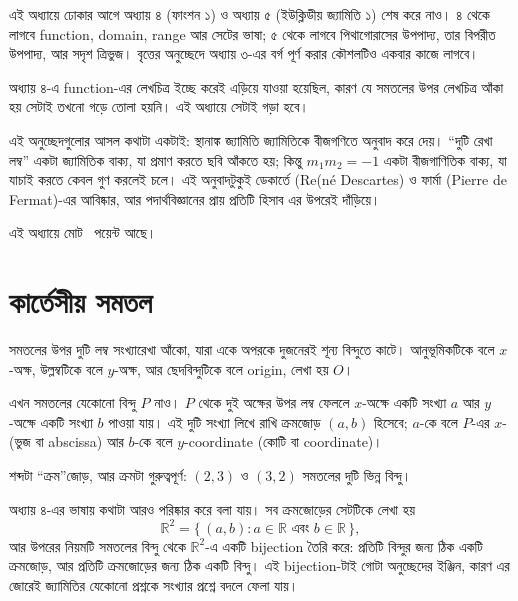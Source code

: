 \documentclass[11pt]{article}
\begin{document}

\noindent
এই অধ্যায়ে ঢোকার আগে অধ্যায় ৪ (ফাংশন ১) ও অধ্যায় ৫ (ইউক্লিডীয়
জ্যামিতি ১) শেষ করে নাও। ৪ থেকে লাগবে function, domain, range আর সেটের ভাষা;
৫ থেকে লাগবে পিথাগোরাসের উপপাদ্য, তার বিপরীত উপপাদ্য, আর সদৃশ ত্রিভুজ। বৃত্তের
অনুচ্ছেদে অধ্যায় ৩-এর বর্গ পূর্ণ করার কৌশলটিও একবার কাজে লাগবে।

অধ্যায় ৪-এ function-এর লেখচিত্র ইচ্ছে
করেই এড়িয়ে যাওয়া হয়েছিল, কারণ যে সমতলের উপর লেখচিত্র আঁকা হয় সেটাই তখনো গড়ে তোলা হয়নি। এই অধ্যায়ে সেটাই গড়া হবে।

এই অনুচ্ছেদগুলোর আসল কথাটা একটাই: স্থানাঙ্ক জ্যামিতি জ্যামিতিকে বীজগণিতে
অনুবাদ করে দেয়। ``দুটি রেখা লম্ব'' একটা জ্যামিতিক বাক্য, যা প্রমাণ করতে ছবি
আঁকতে হয়; কিন্তু $m_1 m_2 = -1$ একটা বীজগাণিতিক বাক্য, যা যাচাই করতে কেবল
গুণ করলেই চলে। এই অনুবাদটুকুই ডেকার্তে (Re(né Descartes) ও ফার্মা (Pierre de Fermat)-এর আবিষ্কার, আর পদার্থবিজ্ঞানের
প্রায় প্রতিটি হিসাব এর উপরেই দাঁড়িয়ে।

এই অধ্যায়ে মোট \totalpoints\ পয়েন্ট আছে।

\section{কার্তেসীয় সমতল}

\begin{idea}[সমতলের স্থানাঙ্ক]
সমতলের উপর দুটি লম্ব সংখ্যারেখা আঁকো, যারা একে অপরকে দুজনেরই শূন্য বিন্দুতে
কাটে। আনুভূমিকটিকে বলে $x$-অক্ষ, উল্লম্বটিকে বলে $y$-অক্ষ, আর ছেদবিন্দুটিকে
বলে origin, লেখা হয় $O$।

এখন সমতলের যেকোনো বিন্দু $P$ নাও। $P$ থেকে দুই অক্ষের উপর লম্ব ফেললে $x$-অক্ষে
একটি সংখ্যা $a$ আর $y$-অক্ষে একটি সংখ্যা $b$ পাওয়া যায়। এই দুটি সংখ্যা লিখে
রাখি ক্রমজোড় $(a, b)$ হিসেবে; $a$-কে বলে $P$-এর $x$- (ভুজ বা abscissa) আর $b$-কে বলে
$y$-coordinate (কোটি বা coordinate)।

শব্দটা ``ক্রম''জোড়, আর ক্রমটা গুরুত্বপূর্ণ: $(2, 3)$ ও $(3, 2)$ সমতলের দুটি
ভিন্ন বিন্দু।
\end{idea}

\noindent
অধ্যায় ৪-এর ভাষায় কথাটা আরও পরিষ্কার করে বলা যায়। সব ক্রমজোড়ের সেটটিকে
লেখা হয়
\[
  \mathbb{R}^2 = \{\, (a, b) : a \in \mathbb{R} \text{ এবং } b \in \mathbb{R} \,\},
\]
আর উপরের নিয়মটি সমতলের বিন্দু থেকে $\mathbb{R}^2$-এ একটি bijection তৈরি করে:
প্রতিটি বিন্দুর জন্য ঠিক একটি ক্রমজোড়, আর প্রতিটি ক্রমজোড়ের জন্য ঠিক একটি
বিন্দু। এই bijection-টাই গোটা অনুচ্ছেদের ইঞ্জিন, কারণ এর জোরেই জ্যামিতির যেকোনো
প্রশ্নকে সংখ্যার প্রশ্নে বদলে ফেলা যায়।
\end{document}
